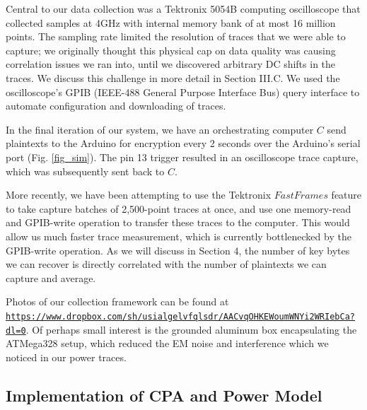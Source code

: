 \documentclass[journal]{ieee_style}
\begin{document}
Central to our data collection was a Tektronix 5054B computing oscilloscope that collected samples at 4GHz with internal memory bank of at most 16 million points. The sampling rate limited the resolution of traces that we were able to capture; we originally thought this physical cap on data quality was causing correlation issues we ran into, until we discovered arbitrary DC shifts in the traces. We discuss this challenge in more detail in Section III.C. We used the oscilloscope's GPIB (IEEE-488 General Purpose Interface Bus) query interface to automate configuration and downloading of traces.

In the final iteration of our system, we have an orchestrating computer $C$ send plaintexts to the Arduino for encryption every 2 seconds over the Arduino's serial port (Fig. \ref{fig_sim}). The pin 13 trigger resulted in an oscilloscope trace capture, which was subsequently sent back to $C$. 

More recently, we have been attempting to use the Tektronix $Fast Frames$ feature to take capture batches of 2,500-point traces at once, and use one memory-read and GPIB-write operation to transfer these traces to the computer. This would allow us much faster trace measurement, which is currently bottlenecked by the GPIB-write operation. As we will discuss in Section 4, the number of key bytes we can recover is directly correlated with the number of plaintexts we can capture and average.

Photos of our collection framework can be found at \texttt{\url{https://www.dropbox.com/sh/usialgelvfqlsdr/AACvqOHKEWoumWNYi2WRIebCa?dl=0}}. Of perhaps small interest is the grounded aluminum box encapsulating the ATMega328 setup, which reduced the EM noise and interference which we noticed in our power traces.

\subsection{Implementation of CPA and Power Model}
\end{document}
